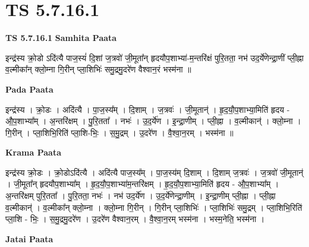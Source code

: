 \documentclass[17pt]{extarticle}
\begin{document}
\section{ TS 5.7.16.1 }

\textbf{TS 5.7.16.1 } \newline
\textbf{Samhita Paata} \newline

इन्द्र॑स्य क्रो॒डो ऽदि॑त्यै पाज॒स्यं॑ दि॒शां ज॒त्रवो॑ जी॒मूता᳚न् हृदयौप॒शाभ्या॑-म॒न्तरि॑क्षं पुरि॒तता॒ नभ॑ उद॒र्ये॑णेन्द्रा॒णीं प्ली॒ह्ना व॒ल्मीका᳚न् क्लो॒म्ना गि॒रीन् प्ला॒शिभिः॑ समु॒द्रमु॒दरे॑ण वैश्वान॒रं भस्म॑ना ॥ \newline

\textbf{Pada Paata} \newline

इन्द्र॑स्य । क्रो॒डः । अदि॑त्यै । पा॒ज॒स्य᳚म् । दि॒शाम् । ज॒त्रवः॑ । जी॒मूतान्॑ । हृ॒द॒यौ॒प॒शाभ्या॒मिति॑ हृदय - औ॒प॒शाभ्या᳚म् । अ॒न्तरि॑क्षम् । पु॒रि॒तता᳚ । नभः॑ । उ॒द॒र्ये॑ण । इ॒न्द्रा॒णीम् । प्ली॒ह्ना । व॒ल्मीकान्॑ । क्लो॒म्ना । गि॒रीन् । प्ला॒शिभि॒रिति॑ प्ला॒शि-भिः॒ । स॒मु॒द्रम् । उ॒दरे॑ण । वै॒श्वा॒न॒रम् । भस्म॑ना ॥  \newline


\textbf{Krama Paata} \newline

इन्द्र॑स्य क्रो॒डः । क्रो॒डोऽदि॑त्यै । अदि॑त्यै पाज॒स्य᳚म् । पा॒ज॒स्य॑म् दि॒शाम् । दि॒शाम् ज॒त्रवः॑ । ज॒त्रवो॑ जी॒मूतान्॑ । जी॒मूता᳚न् हृदयौप॒शाभ्या᳚म् । हृ॒द॒यौ॒प॒शाभ्या॑म॒न्तरि॑क्षम् । हृ॒द॒यौ॒प॒शाभ्या॒मिति॑ हृदय - औ॒प॒शाभ्या᳚म् । अ॒न्तरि॑क्षम् पुरि॒तता᳚ । पु॒रि॒तता॒ नभः॑ । नभ॑ उद॒र्ये॑ण । उ॒द॒र्ये॑णेन्द्रा॒णीम् । इ॒न्द्रा॒णीम् प्ली॒ह्ना । प्ली॒ह्ना व॒ल्मीकान्॑ । व॒ल्मीका᳚न् क्लो॒म्ना । क्लो॒म्ना गि॒रीन् । गि॒रीन् प्ला॒शिभिः॑ । प्ला॒शिभिः॑ समु॒द्रम् । प्ला॒शिभि॒रिति॑ प्ला॒शि - भिः॒ । स॒मु॒द्रमु॒दरे॑ण । उ॒दरे॑ण वैश्वान॒रम् । वै॒श्वा॒न॒रम् भस्म॑ना । भस्म॒नेति॒ भस्म॑ना । \newline

\textbf{Jatai Paata} \newline
\end{document}
